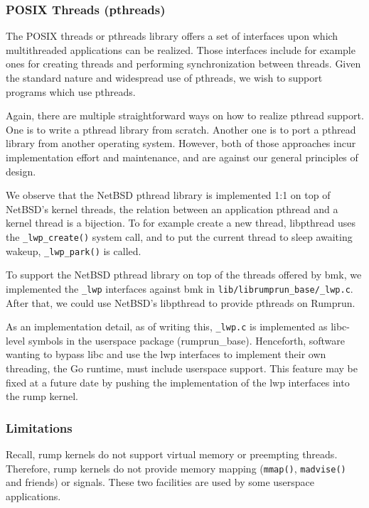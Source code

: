 \subsubsection*{POSIX Threads (pthreads)}

The POSIX threads or pthreads library offers a set of interfaces
upon which multithreaded applications can be realized.  Those
interfaces include for example ones for creating threads and performing
synchronization between threads.  Given the standard nature and widespread
use of pthreads, we wish to support programs which use pthreads.

Again, there are multiple straightforward ways on how to realize pthread
support.  One is to write a pthread library from scratch.  Another one
is to port a pthread library from another operating system.  However,
both of those approaches incur implementation effort and maintenance,
and are against our general principles of design.

We observe that the NetBSD pthread library is implemented 1:1 on top of
NetBSD's kernel threads, \ie the relation between an application pthread
and a kernel thread is a bijection.  To for example create a new thread,
libpthread uses the \verb+_lwp_create()+ system call, and to put the
current thread to sleep awaiting wakeup, \verb+_lwp_park()+ is called.

To support the NetBSD pthread library on top of the threads offered
by bmk, we implemented the \verb+_lwp+ interfaces against bmk in
\verb+lib/librumprun_base/_lwp.c+.  After that, we could use NetBSD's
libpthread to provide pthreads on Rumprun.

As an implementation detail, as of writing this, \verb+_lwp.c+
is implemented as libc-level symbols in the userspace package
(rumprun\_base).  Henceforth, software wanting to bypass libc and
use the lwp interfaces to implement their own threading, \eg the Go
runtime, must include userspace support.  This feature may be fixed at
a future date by pushing the implementation of the lwp interfaces into
the rump kernel.


\subsubsection*{Limitations}

Recall, rump kernels do not support virtual memory or preempting threads.
Therefore, rump kernels do not provide memory mapping (\texttt{mmap()},
\texttt{madvise()} and friends) or signals.  These two facilities are
used by some userspace applications.

